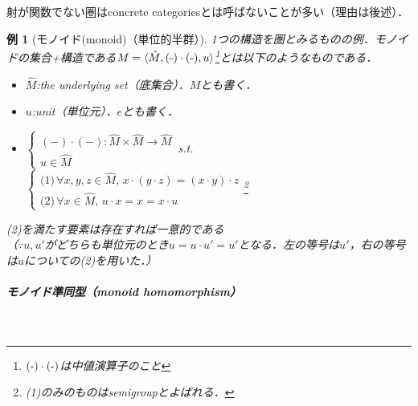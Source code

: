 \documentclass[dvipdfmx,a4j,10pt]{jsarticle}
\theoremstyle{mystyle1}
\theoremstyle{mystyle2}
\newtheorem{example}{例}
\begin{document}
射が関数でない圏はconcrete categoriesとは呼ばないことが多い（理由は後述）．

\begin{example}[モノイド(monoid)（単位的半群）]
    1つの構造を圏とみるものの例．モノイドの集合+構造である$M=\langle \hat{M},(\mathchar`-)\cdot(\mathchar`-),u\rangle$\footnote{$(\mathchar`-)\cdot (\mathchar`-)$は中値演算子のこと}とは以下のようなものである．

    \begin{itemize}
        \item $\hat{M}$:the underlying set（底集合）．$M$とも書く．
        \item $u$:unit（単位元）．$e$とも書く．
        \item $\begin{cases}
                      (-)\cdot(-):\hat{M}\times\hat{M}\to\hat{M} \\
                      u\in\hat{M}
                  \end{cases}$\,\textrm{s.t.}\,
              $\begin{cases}
                      \textrm{(1)}\,\forall x,y,z\in\hat{M},\, x\cdot(y\cdot z)=(x\cdot y)\cdot z \\
                      \textrm{(2)}\,\forall x\in\hat{M},\, u\cdot x=x=x\cdot u
                  \end{cases}$\footnote{(1)のみのものはsemigroupとよばれる．}
    \end{itemize}
    (2)を満たす要素は存在すれば一意的である\\
    （$\because$$u,u'$がどちらも単位元のとき$u=u\cdot u'=u'$となる．左の等号は$u'$，右の等号は$u$についての(2)を用いた．）

        \subparagraph{モノイド準同型（monoid homomorphism）}\


\end{example}
\end{document}
